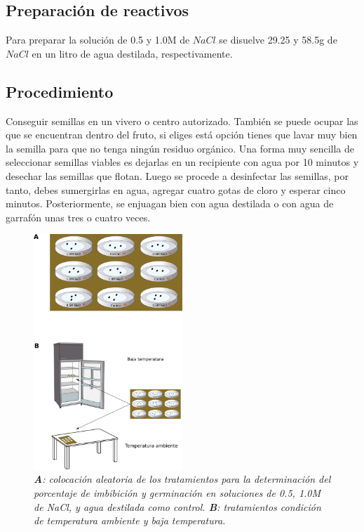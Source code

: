 \subsection{Preparaci\'on de reactivos}

Para preparar la soluci\'on de 0.5 y 1.0M de $NaCl$ se disuelve 29.25 y 58.5g de $NaCl$ en un litro de agua destilada, respectivamente. 

\subsection{Procedimiento}  

Conseguir semillas en un vivero o centro autorizado. Tambi\'en se puede ocupar las que se encuentran dentro del fruto, si eliges est\'a opci\'on tienes que lavar muy bien la semilla para que no tenga ning\'un residuo org\'anico. Una forma muy sencilla de seleccionar semillas viables es dejarlas en un recipiente con agua por 10 minutos y desechar las semillas que flotan. Luego se procede a desinfectar las semillas, por tanto, debes sumergirlas en agua, agregar cuatro gotas de cloro y esperar cinco minutos. Posteriormente, se enjuagan bien con agua destilada o con agua de garraf\'on unas tres o cuatro veces. 

\begin{figure}[h]
	
	\begin{leftbar}
		
		\includegraphics[width=0.5\textwidth]{Petri2.png}
		\centering
		\caption{\textit{\textbf{A}: colocaci\'on aleatoria de los tratamientos para la determinaci\'on del porcentaje de imbibici\'on y germinaci\'on en soluciones de 0.5, 1.0M de NaCl, y agua destilada como control. \textbf{B}: tratamientos condici\'on de temperatura ambiente y baja temperatura.}}
		\label{fig:petri}
		
	\end{leftbar}
	
\end{figure}

